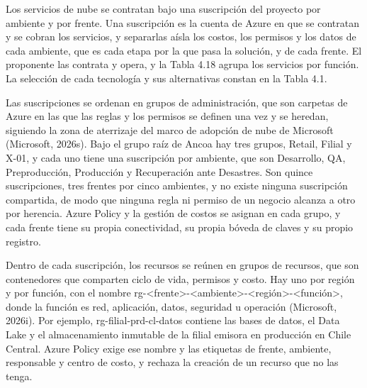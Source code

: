 \documentclass[11pt]{article}
\begin{document}
Los servicios de nube se contratan bajo una suscripción del proyecto por ambiente y por frente. Una suscripción es la cuenta de Azure en que se contratan y se cobran los servicios, y separarlas aísla los costos, los permisos y los datos de cada ambiente, que es cada etapa por la que pasa la solución, y de cada frente. El proponente las contrata y opera, y la Tabla 4.18 agrupa los servicios por función. La selección de cada tecnología y sus alternativas constan en la Tabla 4.1.

Las suscripciones se ordenan en grupos de administración, que son carpetas de Azure en las que las reglas y los permisos se definen una vez y se heredan, siguiendo la zona de aterrizaje del marco de adopción de nube de Microsoft (Microsoft, 2026s). Bajo el grupo raíz de Ancoa hay tres grupos, Retail, Filial y X-01, y cada uno tiene una suscripción por ambiente, que son Desarrollo, QA, Preproducción, Producción y Recuperación ante Desastres. Son quince suscripciones, tres frentes por cinco ambientes, y no existe ninguna suscripción compartida, de modo que ninguna regla ni permiso de un negocio alcanza a otro por herencia. Azure Policy y la gestión de costos se asignan en cada grupo, y cada frente tiene su propia conectividad, su propia bóveda de claves y su propio registro.

Dentro de cada suscripción, los recursos se reúnen en grupos de recursos, que son contenedores que comparten ciclo de vida, permisos y costo. Hay uno por región y por función, con el nombre rg-\textless{}frente\textgreater{}-\textless{}ambiente\textgreater{}-\textless{}región\textgreater{}-\textless{}función\textgreater{}, donde la función es red, aplicación, datos, seguridad u operación (Microsoft, 2026i). Por ejemplo, rg-filial-prd-cl-datos contiene las bases de datos, el Data Lake y el almacenamiento inmutable de la filial emisora en producción en Chile Central. Azure Policy exige ese nombre y las etiquetas de frente, ambiente, responsable y centro de costo, y rechaza la creación de un recurso que no las tenga.

\par\vspace{0pt plus 10\baselineskip}\vspace{0pt plus -10\baselineskip}
\end{document}
